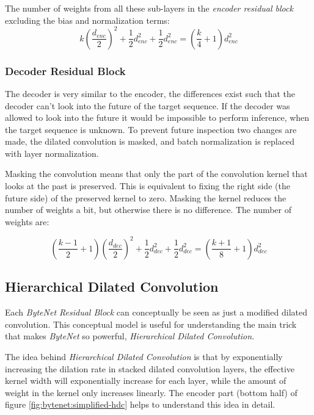 The number of weights from all these sub-layers in the \textit{encoder residual block} excluding the bias and normalization terms:
\begin{equation}
k \left(\frac{d_{enc}}{2}\right)^2 + \frac{1}{2} d_{enc}^2 + \frac{1}{2} d_{enc}^2 = \left(\frac{k}{4} + 1\right) d_{enc}^2
\end{equation}


\subsubsection{Decoder Residual Block}

The decoder is very similar to the encoder, the differences exist such that the decoder can't look into the future of the target sequence. If the decoder was allowed to look into the future it would be impossible to perform inference, when the target sequence is unknown. To prevent future inspection two changes are made‚ the dilated convolution is masked, and batch normalization is replaced with layer normalization.

Masking the convolution means that only the part of the convolution kernel that looks at the past is preserved. This is equivalent to fixing the right side (the future side) of the preserved kernel to zero. Masking the kernel reduces the number of weights a bit, but otherwise there is no difference. The number of weights are:

\begin{equation}
\left(\frac{k-1}{2} + 1\right) \left(\frac{d_{dec}}{2}\right)^2 + \frac{1}{2} d_{dec}^2 + \frac{1}{2} d_{dec}^2 = \left(\frac{k + 1}{8} + 1\right) d_{dec}^2
\end{equation}


\subsection{Hierarchical Dilated Convolution}
\label{sec:theory:bytenet:hierarchical-dilated-convolution}

Each \textit{ByteNet Residual Block} can conceptually be seen as just a modified dilated convolution. This conceptual model is useful for understanding the main trick that makes \textit{ByteNet} so powerful, \textit{Hierarchical Dilated Convolution}.

The idea behind \textit{Hierarchical Dilated Convolution} is that by exponentially increasing the dilation rate in stacked dilated convolution layers, the effective kernel width will exponentially increase for each layer, while the amount of weight in the kernel only increases linearly. The encoder part (bottom half) of figure \ref{fig:bytenet:simplified-hdc} helps to understand this idea in detail.


